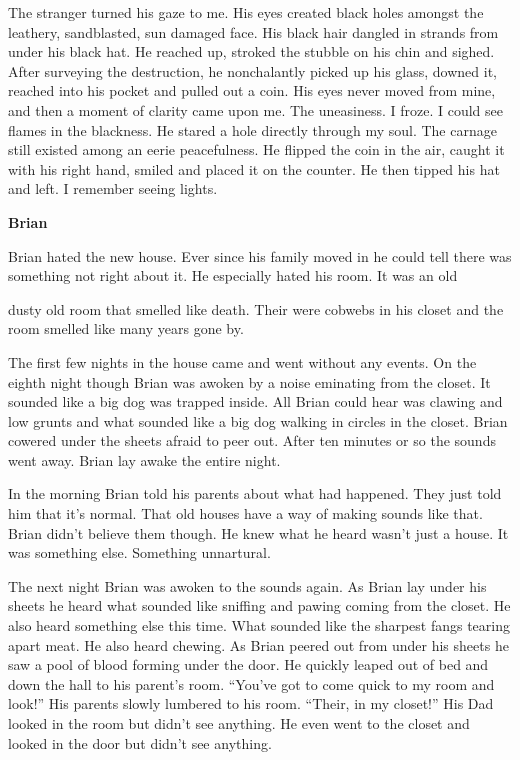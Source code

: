 The stranger turned his gaze to me. His eyes created black holes
amongst the leathery, sandblasted, sun damaged face. His black hair
dangled in strands from under his black hat. He reached up, stroked
the stubble on his chin and sighed. After surveying the
destruction, he nonchalantly picked up his glass, downed it,
reached into his pocket and pulled out a coin. His eyes never moved
from mine, and then a moment of clarity came upon me. The
uneasiness. I froze. I could see flames in the blackness. He stared
a hole directly through my soul. The carnage still existed among an
eerie peacefulness. He flipped the coin in the air, caught it with
his right hand, smiled and placed it on the counter. He then tipped
his hat and left. I remember seeing lights. 

 





{\bf Brian}



Brian hated the new house. Ever since his family moved in he could
tell there was something not right about it. He especially hated
his room. It was an old

dusty old room that smelled like death. Their were cobwebs in his
closet and the room smelled like many years gone by.



The first few nights in the house came and went without any events.
On the eighth night though Brian was awoken by a noise eminating
from the closet. It sounded like a big dog was trapped inside. All
Brian could hear was clawing and low grunts and what sounded like a
big dog walking in circles in the closet. Brian cowered under the
sheets afraid to peer out. After ten minutes or so the sounds went
away. Brian lay awake the entire night.



In the morning Brian told his parents about what had happened. They
just told him that it's normal. That old houses have a way of
making sounds like that. Brian didn't believe them though. He knew
what he heard wasn't just a house. It was something else. Something
unnartural.



The next night Brian was awoken to the sounds again. As Brian lay
under his sheets he heard what sounded like sniffing and pawing
coming from the closet. He also heard something else this time.
What sounded like the sharpest fangs tearing apart meat. He also
heard chewing. As Brian peered out from under his sheets he saw a
pool of blood forming under the door. He quickly leaped out of bed
and down the hall to his parent's room. ``You've got to come quick
to my room and look!'' His parents slowly lumbered to his room.
``Their, in my closet!'' His Dad looked in the room but didn't see
anything. He even went to the closet and looked in the door but
didn't see anything.



